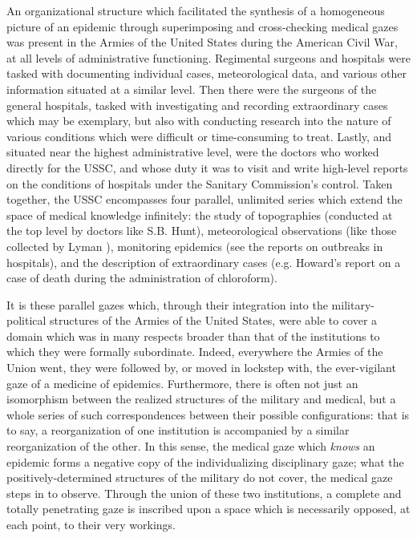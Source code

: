 \documentclass{report}
\begin{document}
  An organizational structure which facilitated the synthesis of a homogeneous picture of an epidemic through superimposing and cross-checking 
  medical gazes was present in the Armies of the United States during the American Civil War, at all levels of administrative functioning. Regimental
  surgeons and hospitals were tasked with documenting individual cases, meteorological data, and various other information situated at a similar
  level. Then there were the surgeons of the general hospitals, tasked with investigating and recording extraordinary cases which may be exemplary,
  but also with conducting research into the nature of various conditions which were difficult or time-consuming to treat. Lastly, and situated near
  the highest administrative level, were the doctors who worked directly for the USSC, and whose duty it was to visit and write high-level
  reports on the conditions of hospitals under the Sanitary Commission's control. Taken together, the USSC encompasses four parallel,
  unlimited series which extend the space of medical knowledge infinitely\autocite[pp.25]{Foucault1994}: the study of topographies 
  (conducted at the top level by doctors like S.B. Hunt\autocite{ussc:6:882}), meteorological observations (like those collected by Lyman 
  \autocite{ussc:6:775}), monitoring epidemics (see the reports on outbreaks in hospitals\autocite{ussc:9:1367}), and the description of extraordinary 
  cases (e.g. Howard's report on a case of death during the administration of chloroform\autocite{ussc:9:1340}).

  It is these parallel gazes which, through their integration into the military-political structures of the Armies of the United States, were able to cover
  a domain which was in many respects broader than that of the institutions to which they were formally subordinate. Indeed, everywhere the Armies
  of the Union went, they were followed by, or moved in lockstep with, the ever-vigilant gaze of a medicine of epidemics. Furthermore,
  there is often not just an isomorphism between the realized structures of the military and medical, but a whole series of such correspondences
  between their possible configurations: that is to say, a reorganization of one institution is accompanied by a similar reorganization of the
  other. In this sense, the medical gaze which \textit{knows} an epidemic forms a negative copy of the individualizing disciplinary gaze; what the
  positively-determined structures of the military do not cover, the medical gaze steps in to observe. Through the union of these two institutions,
  a complete and totally penetrating gaze is inscribed upon a space which is necessarily opposed, at each point, to their very workings.
\end{document}
